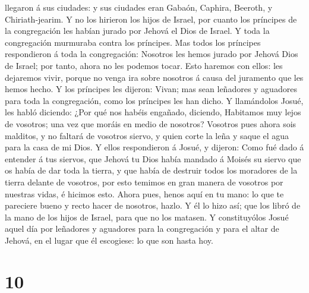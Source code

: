 llegaron á sus ciudades: y sus ciudades eran Gabaón, Caphira, Beeroth, y
Chiriath-jearim.  Y no los hirieron los hijos de Israel,
por cuanto los príncipes de la congregación les habían jurado por Jehová
el Dios de Israel. Y toda la congregación murmuraba contra los
príncipes.  Mas todos los príncipes respondieron á toda la
congregación: Nosotros les hemos jurado por Jehová Dios de Israel; por
tanto, ahora no les podemos tocar.  Esto haremos con ellos:
les dejaremos vivir, porque no venga ira sobre nosotros á causa del
juramento que les hemos hecho.  Y los príncipes les
dijeron: Vivan; mas sean leñadores y aguadores para toda la
congregación, como los príncipes les han dicho.  Y
llamándolos Josué, les habló diciendo: ¿Por qué nos habéis engañado,
diciendo, Habitamos muy lejos de vosotros; una vez que moráis en medio
de nosotros?  Vosotros pues ahora sois malditos, y no
faltará de vosotros siervo, y quien corte la leña y saque el agua para
la casa de mi Dios.  Y ellos respondieron á Josué, y
dijeron: Como fué dado á entender á tus siervos, que Jehová tu Dios
había mandado á Moisés su siervo que os había de dar toda la tierra, y
que había de destruir todos los moradores de la tierra delante de
vosotros, por esto temimos en gran manera de vosotros por nuestras
vidas, é hicimos esto.  Ahora pues, henos aquí en tu mano:
lo que te pareciere bueno y recto hacer de nosotros, hazlo.
 Y él lo hizo así; que los libró de la mano de los hijos de
Israel, para que no los matasen.  Y constituyólos Josué
aquel día por leñadores y aguadores para la congregación y para el altar
de Jehová, en el lugar que él escogiese: lo que son hasta hoy.

\hypertarget{section-9}{%
\section{10}\label{section-9}}

